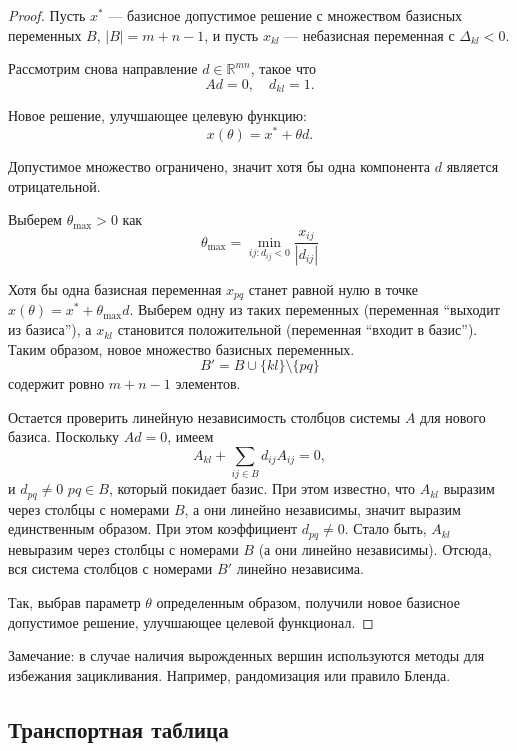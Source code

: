 \documentclass[12pt]{article}
\theoremstyle{definition}
\theoremstyle{plain}
\theoremstyle{definition}
\begin{document}
\begin{proof}
Пусть $x^*$ --- базисное допустимое решение с множеством базисных переменных $B$, 
$|B| = m+n-1$, и пусть $x_{kl}$ --- небазисная переменная с $\Delta_{kl} < 0$. 

Рассмотрим снова направление $d \in \mathbb{R}^{mn}$, такое что
\[
A d = 0, \quad d_{kl} = 1.
\]

Новое решение, улучшающее целевую функцию:
\[
x(\theta) = x^* + \theta d.
\]

Допустимое множество ограничено, значит хотя бы одна компонента $d$ является отрицательной.

Выберем $\theta_{\max} > 0$ как
\begin{equation}\label{eq:theta}
\theta_{\max} = \min_{ij: d_{ij} < 0}{\frac{x_{ij}}{|d_{ij}|}}
\end{equation}

Хотя бы одна базисная переменная $x_{pq}$ станет равной нулю в точке
$x(\theta) = x^* + \theta_{\max}d$. Выберем одну из таких переменных
(переменная ``выходит из базиса''), а $x_{kl}$ становится
положительной (переменная ``входит в базис''). 
Таким образом, новое множество базисных переменных.
\[
B' = B \cup \{kl\} \setminus \{pq\}
\]
содержит ровно $m+n-1$ элементов.

Остается проверить линейную независимость столбцов системы $A$ для нового базиса. 
Поскольку $A d = 0$, имеем
\[
A_{kl} + \sum_{ij \in B} d_{ij} A_{ij} = 0,
\]
и $d_{pq} \neq 0$ $pq \in B$, который покидает базис. При этом известно, что $A_{kl}$
выразим через столбцы с номерами $B$, а они линейно независимы, значит выразим единственным образом.
При этом коэффициент $d_{pq} \neq 0$. Стало быть, $A_{kl}$ невыразим через столбцы с
номерами $B$ (а они линейно независимы). Отсюда, вся система столбцов с номерами $B'$ линейно независима.

Так, выбрав параметр $\theta$ определенным образом, получили новое базисное допустимое решение,
улучшающее целевой функционал.
\end{proof}

Замечание: в случае наличия вырожденных вершин используются
методы для избежания зацикливания. Например, рандомизация или правило Бленда\cite{conf5}.










\subsection{Транспортная таблица}
\end{document}
